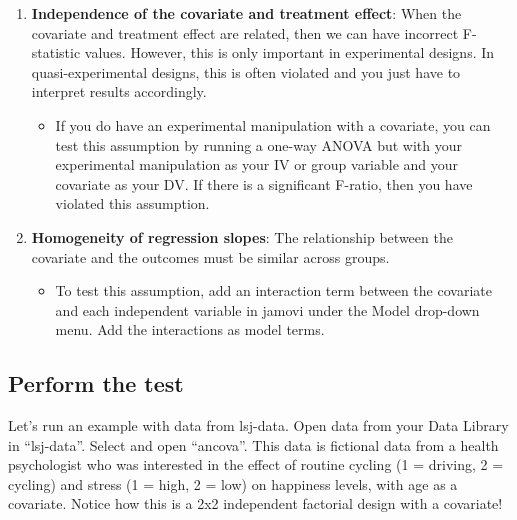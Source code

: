 \documentclass[
]{book}
\providecommand{\tightlist}{%
  \setlength{\itemsep}{0pt}\setlength{\parskip}{0pt}}
\begin{document}
\begin{enumerate}
\def\labelenumi{\arabic{enumi}.}
\item
  \textbf{Independence of the covariate and treatment effect}: When the covariate and treatment effect are related, then we can have incorrect F-statistic values. However, this is only important in experimental designs. In quasi-experimental designs, this is often violated and you just have to interpret results accordingly.

  \begin{itemize}
  \tightlist
  \item
    If you do have an experimental manipulation with a covariate, you can test this assumption by running a one-way ANOVA but with your experimental manipulation as your IV or group variable and your covariate as your DV. If there is a significant F-ratio, then you have violated this assumption.
  \end{itemize}
\item
  \textbf{Homogeneity of regression slopes}: The relationship between the covariate and the outcomes must be similar across groups.

  \begin{itemize}
  \tightlist
  \item
    To test this assumption, add an interaction term between the covariate and each independent variable in jamovi under the Model drop-down menu. Add the interactions as model terms.
  \end{itemize}
\end{enumerate}

\hypertarget{perform-the-test-8}{%
\subsection{Perform the test}\label{perform-the-test-8}}

Let's run an example with data from lsj-data. Open data from your Data Library in ``lsj-data''. Select and open ``ancova''. This data is fictional data from a health psychologist who was interested in the effect of routine cycling (1 = driving, 2 = cycling) and stress (1 = high, 2 = low) on happiness levels, with age as a covariate. Notice how this is a 2x2 independent factorial design with a covariate!
\end{document}
